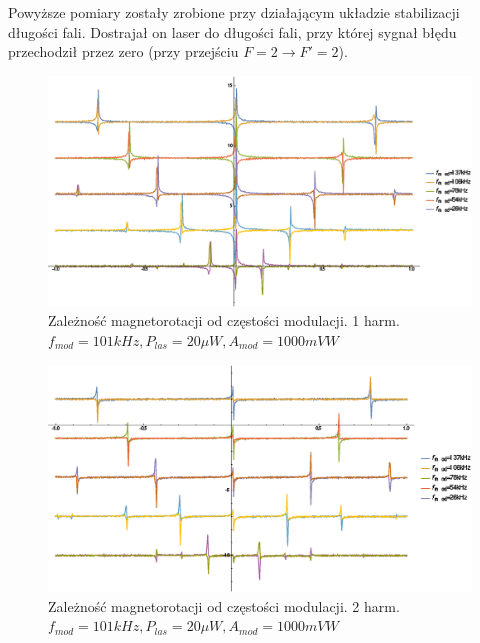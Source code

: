 \documentclass[a4paper,10pt,twoside]{article}
\begin{document}
Powyższe pomiary zostały zrobione przy działającym układzie stabilizacji długości fali. Dostrajał on laser do długości fali, przy której sygnał błędu przechodził przez zero (przy przejściu $F=2 \rightarrow F'=2$).

\begin{figure}[h!]
\centering
 \includegraphics[width=\textwidth]{panoramy_1H_odf.eps}
 \caption{Zależność magnetorotacji od częstości modulacji. 1 harm. $f_{mod}=101kHz, P_{las}=20 \mu W, A_{mod}=1000mV W$}
 \label{fig:panodf1}
\end{figure}

\begin{figure}[h!]
\centering
 \includegraphics[width=\textwidth]{panoramy_2H_odf.eps}
 \caption{Zależność magnetorotacji od częstości modulacji. 2 harm. $f_{mod}=101kHz, P_{las}=20 \mu W, A_{mod}=1000mV W$}
 \label{fig:panodf2}
\end{figure}
\end{document}
